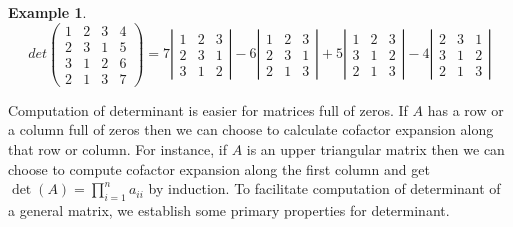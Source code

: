 \documentclass[12pt]{amsart}
\theoremstyle{definition}
\newtheorem{example}[theorem]{Example}
\begin{document}
\begin{example}
$$det\left(\begin{array}{cccc} 1 & 2 & 3 & 4 \\ 2 & 3 & 1 & 5 \\ 3 & 1 & 2 & 6 \\ 2 & 1 & 3 & 7 \end{array}\right) = 7 \left|\begin{array}{ccc} 1 & 2 & 3 \\ 2 & 3 & 1\\ 3 & 1 & 2 \end{array}\right| - 6\left|\begin{array}{ccc} 1 & 2 & 3 \\ 2 & 3 & 1 \\ 2 & 1 & 3 \end{array}\right| + 5 \left|\begin{array}{ccc} 1 & 2 & 3 \\ 3 & 1 & 2 \\ 2 & 1 & 3\end{array}\right| - 4 \left|\begin{array}{ccc} 2 & 3 & 1\\ 3 & 1 & 2 \\ 2 & 1 & 3 \end{array}\right|$$
\end{example}

Computation of determinant is easier for matrices full of zeros. If $A$ has a row or a column full of zeros then we can choose to calculate cofactor expansion along that row or column. For instance, if $A$ is an upper triangular matrix then we can choose to compute cofactor expansion along the first column and get $\det(A) = \prod\limits_{i = 1}^{n}a_{ii}$ by induction. To facilitate computation of determinant of a general matrix, we establish some primary properties for determinant.
\end{document}
